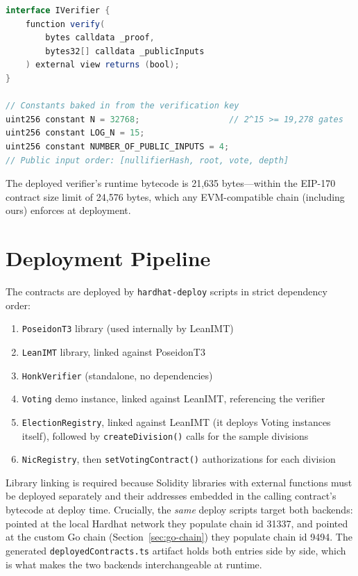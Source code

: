 \begin{lstlisting}[language=Java, caption={Verifier interface and key constants.}]
interface IVerifier {
    function verify(
        bytes calldata _proof,
        bytes32[] calldata _publicInputs
    ) external view returns (bool);
}

// Constants baked in from the verification key
uint256 constant N = 32768;                  // 2^15 >= 19,278 gates
uint256 constant LOG_N = 15;
uint256 constant NUMBER_OF_PUBLIC_INPUTS = 4;
// Public input order: [nullifierHash, root, vote, depth]
\end{lstlisting}

The deployed verifier's runtime bytecode is 21{,}635 bytes---within the EIP-170 contract size limit of 24{,}576 bytes, which any EVM-compatible chain (including ours) enforces at deployment.

\section{Deployment Pipeline}

The contracts are deployed by \texttt{hardhat-deploy} scripts in strict dependency order:

\begin{enumerate}
    \item \texttt{PoseidonT3} library (used internally by LeanIMT)
    \item \texttt{LeanIMT} library, linked against PoseidonT3
    \item \texttt{HonkVerifier} (standalone, no dependencies)
    \item \texttt{Voting} demo instance, linked against LeanIMT, referencing the verifier
    \item \texttt{ElectionRegistry}, linked against LeanIMT (it deploys Voting instances itself), followed by \texttt{createDivision()} calls for the sample divisions
    \item \texttt{NicRegistry}, then \texttt{setVotingContract()} authorizations for each division
\end{enumerate}

Library linking is required because Solidity libraries with external functions must be deployed separately and their addresses embedded in the calling contract's bytecode at deploy time. Crucially, the \emph{same} deploy scripts target both backends: pointed at the local Hardhat network they populate chain id 31337, and pointed at the custom Go chain (Section~\ref{sec:go-chain}) they populate chain id 9494. The generated \texttt{deployedContracts.ts} artifact holds both entries side by side, which is what makes the two backends interchangeable at runtime.

